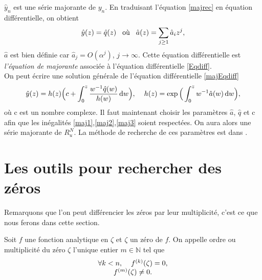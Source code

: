 \documentclass[a4paper,10pt]{article}
\begin{document}
	$\hat{y}_n$ est une série majorante de $y_n$. En traduisant l'équation \eqref{majrec} en équation différentielle, on obtient
	\begin{equation}
	[\theta-\hat{a}(z)] \hat{y}(z) = \hat{q}(z) \hspace{3mm} \text{où} \hspace{3mm} \hat{a}(z)=\sum_{j \geq 1} \hat{a}_iz^j,
	\label{majEqdiff}
	\end{equation}
	$\hat{a}$ est bien définie car $\hat{a}_j=O(\alpha^j)$, $j \rightarrow \infty$. Cette équation différentielle est \textit{l'équation de majorante} associée à l'équation différentielle \eqref{Eqdiff}.\\
	On peut écrire une solution générale de l'équation différentielle \eqref{majEqdiff} 
	\begin{equation}
	\hat{y}(z)=h(z)\Big(c+\int_{0}^{z}\frac{w^{-1}\hat{q}(w)}{h(w)}\, \mathrm{d}w\Big), \hspace{4mm} h(z)=\exp\Big(\int_{0}^{z}w^{-1}\hat{a}(w)\, \mathrm{d}w\Big),
	\end{equation}
	où c est un nombre complexe. Il faut maintenant choisir les paramètres $\hat{a}$, $\hat{q}$ et c afin que les inégalités \eqref{maj1},\eqref{maj2},\eqref{maj3} soient respectées. On aura alors une série majorante de $R_u^{N}$. La méthode de recherche de ces paramètres est dans \cite{Mezzarobba2019}.
	
	
	
	
	\section{Les outils pour rechercher des zéros}
	\label{sec:outils}
	Remarquons que l'on peut différencier les zéros par leur multiplicité, c'est ce que nous ferons dans cette section.
	
	\begin{definition}
		Soit $f$ une fonction analytique en $\zeta$ et $\zeta$ un zéro de $f$. On appelle ordre ou multiplicité du zéro $\zeta$ l'unique entier $m \in \mathbb{N}$ tel que 
		\begin{equation}
		\begin{array}{ccc}
		\forall k<n, \hspace{4mm} f^{(k)}(\zeta)=0,\\
		f^{(m)}(\zeta)\neq 0.
		\end{array}
		\end{equation}
		\label{multiplicité}
	\end{definition}
	
\end{document}
